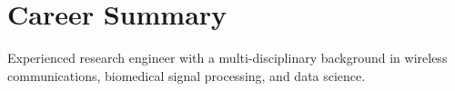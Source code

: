 \section{Career Summary}

Experienced research engineer with a multi-disciplinary background in wireless communications, biomedical signal processing, and data science.
